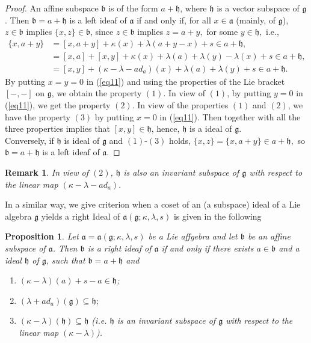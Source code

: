 \documentclass{article}
\newtheorem{remark}{Remark}[section]
\newtheorem{prop}{Proposition}[section]
\theoremstyle{definition}
\theoremstyle{remark}
\theoremstyle{plain}
\begin{document}
    \begin{proof}
        An affine subspace $\mathfrak{b}$ is of the form $a+\mathfrak{h}$, where $\mathfrak{h}$ is a vector subspace of $\mathfrak{g}$. Then $\mathfrak{b}=a+\mathfrak{h}$ is a left ideaf of $\mathfrak{a}$ if and only if, for all $x\in \mathfrak{a} $ (mainly, of $\mathfrak{g}$), $z \in \mathfrak{b}$ implies $\{x, z\} \in \mathfrak{b}$, since $z\in \mathfrak{b}$ implies $z= a+y,$ for some $y\in \mathfrak{h},$ i.e.,
\begin{align}
\{x, a+y\}&=[x, a+y]+\kappa(x)+\lambda(a+y-x)+s \in a+\mathfrak{h},\tag*{}\\
&=[x, a]+[x, y]+\kappa(x)+\lambda(a)+\lambda(y)-\lambda(x)+s \in a+\mathfrak{h},\tag*{}\\
&=[x, y]+(\kappa- \lambda-ad_{a})(x)+\lambda(a)+\lambda(y)+s \in a+\mathfrak{h}.\label{eq11}
\end{align}
By putting $x=y=0$ in (\ref{eq11}) and using the properties of the Lie bracket $[-, -]$ on $\mathfrak{g}$, we obtain the property $(1)$. In view of $(1)$, by putting $y=0$ in (\ref{eq11}), we get the property $(2)$. In view of the properties $(1)$ and $(2)$, we have the property $(3)$ by putting $x=0$ in (\ref{eq11}). Then together with all the three properties implies that $[x, y] \in \mathfrak{h}$, hence, $\mathfrak{h}$ is a ideal of $\mathfrak{g}$.\\
Conversely, if $\mathfrak{h}$ is ideal of $\mathfrak{g}$ and $(1)$-$(3)$ holds, $\{x, z\}=\{x, a+y\} \in a+ \mathfrak{h},$ so $\mathfrak{b}=a+\mathfrak{h}$ is a left ideaf of $\mathfrak{a}.$
    \end{proof}
    \begin{remark}
        In view of $(2)$, $\mathfrak{h}$ is also an invariant subspace of $\mathfrak{g}$ with respect to the linear map $(\kappa -\lambda-ad_{a}).$
    \end{remark}
    In a similar way, we give criterion when a coset of an (a subspace) ideal of a Lie algebra $\mathfrak{g}$ yields a right Ideal of $\mathfrak{a}(\mathfrak{g}; \kappa, \lambda, s)$ is given in the following
\begin{prop}\label{2}
     Let $\mathfrak{a}=\mathfrak{a}(\mathfrak{g}; \kappa, \lambda, s)$ be a Lie affgebra and let $\mathfrak{b}$ be an affine subspace of $\mathfrak{a}$. Then $\mathfrak{b}$ is a right ideaf of $\mathfrak{a}$ if and only if there exists $a\in \mathfrak{b}$ and a ideal $\mathfrak{h}$ of $\mathfrak{g}$, such that $\mathfrak{b}=a+\mathfrak{h}$ and 
        \begin{enumerate}
            \item $(\kappa - \lambda)(a)+s-a \in \mathfrak{h}$;
            \item $(\lambda + ad_{a})(\mathfrak{g})\subseteq \mathfrak{h};$
            \item $(\kappa -\lambda) (\mathfrak{h})\subseteq \mathfrak{h}$ (i.e. $\mathfrak{h}$ is an invariant subspace of $\mathfrak{g}$ with respect to the linear map $(\kappa-\lambda)$).
        \end{enumerate}
\end{prop}
\end{document}
